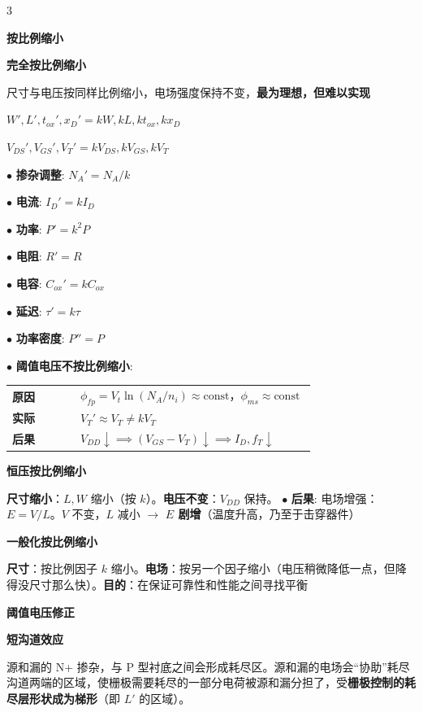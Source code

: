 \documentclass[10pt, a4paper, landscape]{article}
\makeatletter
\newcommand{\red}[1]{\textbf{\textcolor{myred}{#1}}}
\newcommand{\blue}[1]{\textbf{\textcolor{myblue}{#1}}}
\newcommand{\entry}[2]{$\bullet$ \textbf{#1}: #2\par\vspace{0.5pt}}
\newcommand{\cbox}[2][yellow]{\begingroup\setlength{\fboxsep}{1pt}\colorbox{#1}{\strut#2}\endgroup}
\newcommand{\hlyellow}[1]{\cbox[hlyellow]{#1}}
\newcommand{\hlgreen}[1]{\cbox[hlgreen]{#1}}
\newcommand{\concepttable}[1]{%
    {\setlength{\tabcolsep}{1.5pt}%
     \renewcommand{\arraystretch}{0.92}%
     \par\vspace{2pt}{\color{myblue}\hrule height 0.6pt}\vspace{1pt}%
     \noindent\begin{tabular}{@{}p{0.22\linewidth}p{0.76\linewidth}@{}}%
     #1%
     \end{tabular}%
     \vspace{1pt}{\color{myblue}\hrule height 0.6pt}\par\vspace{2pt}}%
}
\newcommand{\conrow}[2]{\blue{#1} & #2 \\}
\makeatother
\begin{document}
\begin{multicols*}{3}
\begin{minipage}[t]{0.49\linewidth}
\end{minipage}

\hlyellow{\textbf{按比例缩小}}
\par
\hlgreen{\textbf{完全按比例缩小}}
尺寸与电压按同样比例缩小，电场强度保持不变，\red{最为理想，但难以实现}

\noindent
\begin{minipage}[t]{0.49\linewidth}
$W',L',t_{ox}',x_D' = kW, kL, kt_{ox}, kx_D$
\end{minipage}
\hfill
\begin{minipage}[t]{0.49\linewidth}
$V_{DS}',V_{GS}',V_T' = kV_{DS}, kV_{GS}, kV_T$
\end{minipage}

\noindent
\begin{minipage}[t]{0.32\linewidth}
\entry{掺杂调整}{$N_A' = N_A/k$ }
\entry{电流}{$I_D' = kI_D$}
\end{minipage}
\hfill
\begin{minipage}[t]{0.32\linewidth}
\entry{功率}{$P' = k^2P$}
\entry{电阻}{$R' = R$}\entry{电容}{$C_{ox}' = kC_{ox}$}
\end{minipage}
\hfill
\begin{minipage}[t]{0.32\linewidth}
\entry{延迟}{$\tau' = k\tau$}
\entry{功率密度}{$P'' = P$}
\end{minipage}

\entry{阈值电压不按比例缩小}{
    \concepttable{
        \conrow{原因}{$\phi_{fp} = V_t \ln(N_A/n_i) \approx \text{const}$，$\phi_{ms} \approx \text{const}$}
        \conrow{实际}{$V_T' \approx V_T \neq kV_T$}
        \conrow{后果}{$V_{DD} \downarrow \implies (V_{GS}-V_T) \downarrow \implies I_D, f_T \downarrow$}
    }
}

\noindent
\begin{minipage}[t]{0.49\linewidth}
    \hlgreen{\textbf{恒压按比例缩小}}
    \textbf{尺寸缩小}：$L, W$ 缩小（按 $k$）。\textbf{电压不变}：$V_{DD}$ 保持。
    \entry{后果}{电场增强：$E = V/L$。$V$ 不变，$L$ 减小 $\to$ \red{$E$ 剧增}（温度升高，乃至于击穿器件）}
\end{minipage}
\hfill
\begin{minipage}[t]{0.49\linewidth}
    \hlgreen{\textbf{一般化按比例缩小}}
    \textbf{尺寸}：按比例因子 $k$ 缩小。\textbf{电场}：按另一个因子缩小（电压稍微降低一点，但降得没尺寸那么快）。\textbf{目的}：在保证可靠性和性能之间寻找平衡
\end{minipage}

\hlyellow{\textbf{阈值电压修正}}
\par
\hlgreen{\textbf{短沟道效应}}
源和漏的 N+ 掺杂，与 P 型衬底之间会形成耗尽区。源和漏的电场会“协助”耗尽沟道两端的区域，使栅极需要耗尽的一部分电荷被源和漏分担了，受\red{栅极控制的耗尽层形状成为梯形}（即 $L'$ 的区域）。


\end{multicols*}
\end{document}
